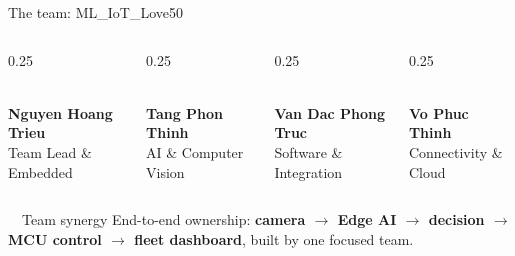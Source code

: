 \documentclass[aspectratio=169, 10pt]{beamer}
\begin{document}
\begin{frame}{The team: ML\_IoT\_Love50}
  \vspace{0.3em}
  \begin{columns}[T]
    \begin{column}{0.25\textwidth}
      \centering
      \\[0.3em]
      {\footnotesize\bfseries\color{MLIOTnavy}Nguyen Hoang Trieu}\\
      {\scriptsize Team Lead \& Embedded}
    \end{column}
    \begin{column}{0.25\textwidth}
      \centering
      \\[0.3em]
      {\footnotesize\bfseries\color{MLIOTnavy}Tang Phon Thinh}\\
      {\scriptsize AI \& Computer Vision}
    \end{column}
    \begin{column}{0.25\textwidth}
      \centering
      \\[0.3em]
      {\footnotesize\bfseries\color{MLIOTnavy}Van Dac Phong Truc}\\
      {\scriptsize Software \& Integration}
    \end{column}
    \begin{column}{0.25\textwidth}
      \centering
      \\[0.3em]
      {\footnotesize\bfseries\color{MLIOTnavy}Vo Phuc Thinh}\\
      {\scriptsize Connectivity \& Cloud}
    \end{column}
  \end{columns}
  \vspace{1.0em}
  \begin{center}
    \begin{goldcard}[width=0.9\textwidth]{\faUsers~~Team synergy}
      \small End-to-end ownership: \textbf{camera $\to$ Edge AI $\to$ decision $\to$ MCU control $\to$ fleet dashboard}, built by one focused team.
    \end{goldcard}
  \end{center}
\end{frame}
\end{document}
